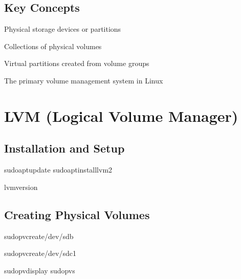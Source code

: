 \documentclass[letterpaper,10pt,english]{sphinxmanual}
\begin{document}
\subsection{Key Concepts}
\label{\detokenize{volume-management:key-concepts}}\begin{description}
\sphinxAtStartPar
Physical storage devices or partitions

\sphinxAtStartPar
Collections of physical volumes

\sphinxAtStartPar
Virtual partitions created from volume groups

\sphinxAtStartPar
The primary volume management system in Linux

\end{description}


\section{LVM (Logical Volume Manager)}
\label{\detokenize{volume-management:lvm-logical-volume-manager}}

\subsection{Installation and Setup}
\label{\detokenize{volume-management:installation-and-setup}}
\begin{sphinxVerbatim}[commandchars=\\\{\}]
sudoaptupdate
sudoaptinstalllvm2

lvmversion
\end{sphinxVerbatim}


\subsection{Creating Physical Volumes}
\label{\detokenize{volume-management:creating-physical-volumes}}
\begin{sphinxVerbatim}[commandchars=\\\{\}]
sudopvcreate/dev/sdb

sudopvcreate/dev/sdc1

sudopvdisplay
sudopvs
\end{sphinxVerbatim}
\end{document}
